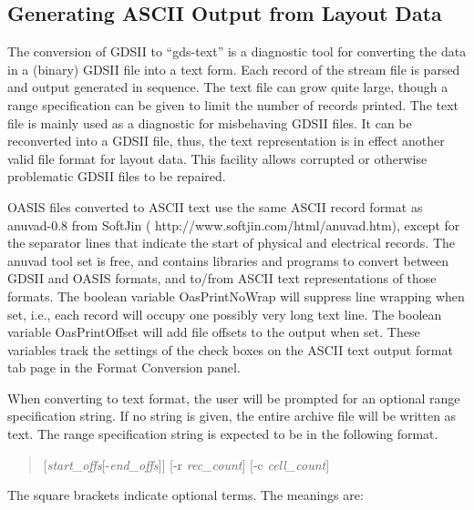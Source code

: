 \subsection{Generating ASCII Output from Layout Data}
The conversion of GDSII to ``gds-text'' is a diagnostic tool for
converting the data in a (binary) GDSII file into a text form.  Each
record of the stream file is parsed and output generated in sequence. 
The text file can grow quite large, though a range specification can
be given to limit the number of records printed.  The text file is
mainly used as a diagnostic for misbehaving GDSII files.  It can be
reconverted into a GDSII file, thus, the text representation is in
effect another valid file format for layout data.  This facility
allows corrupted or otherwise problematic GDSII files to be repaired.

OASIS files converted to ASCII text use the same ASCII record format
as {\vt anuvad-0.8} from {\cb SoftJin} ({\vt
http://www.softjin.com/html/anuvad.htm}), except for the separator
lines that indicate the start of physical and electrical records.  The
{\vt anuvad} tool set is free, and contains libraries and programs to
convert between GDSII and OASIS formats, and to/from ASCII text
representations of those formats.  The boolean variable {\et
OasPrintNoWrap} will suppress line wrapping when set, i.e., each
record will occupy one possibly very long text line.  The boolean
variable {\et OasPrintOffset} will add file offsets to the output when
set.  These variables track the settings of the check boxes on the
{\cb ASCII text} output format tab page in the {\cb Format Conversion}
panel.

When converting to text format, the user will be prompted for an
optional range specification string.  If no string is given, the
entire archive file will be written as text.  The range specification
string is expected to be in the following format.

\begin{quote}
    [{\it start\_offs\/}[{\vt -}{\it end\_offs\/}]] [{\vt -r}
      {\it rec\_count\/}] [{\vt -c} {\it cell\_count\/}]
\end{quote}

    The square brackets indicate optional terms.  The meanings are:

